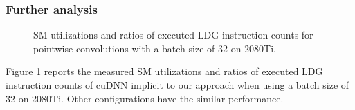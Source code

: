\subsubsection{Further analysis}
\begin{figure}
    \centering
    \qquad
    \vspace{5mm}
    \vspace{-4mm}
    \caption{SM utilizations and ratios of executed LDG instruction counts for pointwise convolutions with a batch size of 32 on 2080Ti.}
    \label{fig:pwinfo}
\end{figure}
Figure \ref{fig:pwinfo} reports the measured SM utilizations and ratios of executed LDG instruction counts of cuDNN implicit to our approach when using a batch size of 32 on 2080Ti. Other configurations have the similar performance. 

